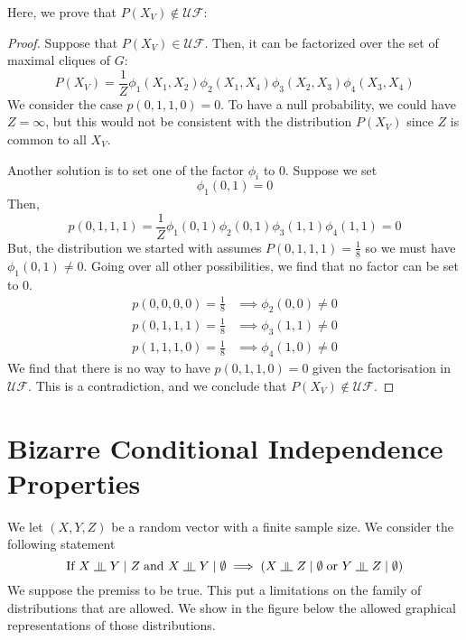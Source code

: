 \documentclass{article}
\numberwithin{equation}{section}
\newcommand{\s}{\hspace{0.1cm}}
\newcommand{\indep}{\s \rotatebox[origin=c]{90}{$\models$}\s }
\theoremstyle{named}
\begin{document}
Here, we prove that $P(X_V) \not\in \mathcal{UF}$:
\begin{proof}
        Suppose that $P(X_V) \in \mathcal{UF}$. Then, it can be factorized 
        over the set of maximal cliques of $G$:
        \[
                P(X_V) = \frac{1}{Z} \phi_1(X_1, X_2) \phi_2(X_1, X_4) 
                \phi_3(X_2, X_3) \phi_4(X_3, X_4)
        \]
        We consider the case $p(0, 1, 1, 0) = 0$. To have a null probability, 
        we could have $Z = \infty $, but this would not be consistent with 
        the distribution $P(X_V)$ since $Z$ is common to all $X_V$.

        Another solution is to set one of the factor $\phi_i$ to $0$. 
        Suppose we set 
        \[
                \phi_1(0, 1) = 0
        \]
        Then, 
        \[
                p(0, 1, 1, 1) = \frac{1}{Z}\phi_1(0, 1)\phi_2(0, 1) 
                \phi_3(1, 1) \phi_4(1, 1) = 0
        \]
        But, the distribution we started with assumes $P(0, 1, 1, 1) = \frac{1}{8}$ 
        so we must have $\phi_1(0, 1) \not= 0$. 
        Going over all other possibilities, we find that no factor can be 
        set to 0.
        \begin{align*}
                p(0, 0, 0, 0) = \frac{1}{8} &\implies \phi_2(0, 0) \not= 0\\
                p(0, 1, 1, 1) = \frac{1}{8} &\implies \phi_3(1, 1) \not= 0 \\
                p(1, 1, 1, 0) = \frac{1}{8} &\implies \phi_4(1, 0) \not= 0
        \end{align*}
        We find that there is no way to have $p(0, 1, 1, 0) = 0$ given the 
        factorisation in $\mathcal{UF}$.
        This is a contradiction, and we conclude that $P(X_V) \not\in \mathcal{UF}$.

\end{proof}


\section{Bizarre Conditional Independence Properties}
We let $(X, Y, Z)$ be a random vector with a finite sample size. We consider 
the following statement
\begin{equation}\label{eq:Statement}
        \text{If } X \indep Y \mid Z \s \text{and } X \indep Y \mid \emptyset
        \implies  (X \indep Z \mid \emptyset \s \text{or } Y \indep Z \mid \emptyset )
\end{equation} 
We suppose the premiss to be true. This put a limitations on the family of distributions 
that are allowed. We show in the figure below the allowed graphical representations 
of those distributions.
\end{document}
